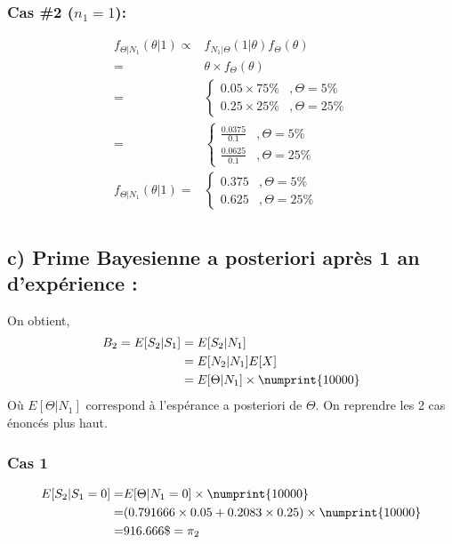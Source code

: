 \subsubsection*{Cas \#2 ($n_1 = 1$): }
\begin{align*}
f_{\Theta|N_1}(\theta|1) \propto & f_{N_1|\Theta}(1|\theta) f_{\Theta}(\theta) \\
= & \theta \times  f_{\Theta}(\theta) \\
= & \left\{
     \begin{array}{rl}
      0.05 \times  75\% &, \Theta = 5\% \\
      0.25 \times  25\% &, \Theta = 25\%
     \end{array}
     \right. \\
= & \left\{
     \begin{array}{rl}
      \frac{0.0375}{0.1} &, \Theta = 5\% \\
      \frac{0.0625}{0.1} &, \Theta = 25\%
     \end{array}
     \right. \\
f_{\Theta|N_1}(\theta|1) = & \left\{
     \begin{array}{rl}
      0.375 &, \Theta = 5\% \\
      0.625 &, \Theta = 25\%
     \end{array}
     \right. \\
\end{align*}

\subsection*{c) Prime Bayesienne a posteriori après 1 an d'expérience :}
On obtient,
\begin{align*}
B_2 = E[S_2|S_1] &= E[S_2|N_1] \\
&= E[N_2|N_1] E[X] \\
&= E[\Theta|N_1] \times  \numprint{10000}
\end{align*}
Où $E[\Theta|N_1]$ correspond à l'espérance a posteriori de $\Theta$.
On reprendre les 2 cas énoncés plus haut.

\subsubsection*{Cas 1}
\begin{align*}
E[S_2|S_1 = 0] =& E[\Theta|N_1 = 0] \times  \numprint{10000} \\
=& (0.791666\times 0.05 + 0.2083\times 0.25) \times  \numprint{10000}\\
=& 916.666\$ = \pi_2
\end{align*}

